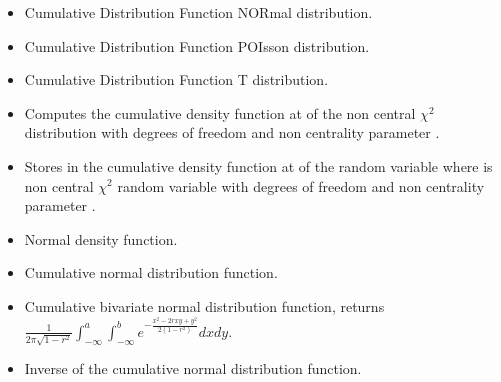 \begin{itemize}
\item {}
  \sshortdescribe Cumulative Distribution Function NORmal distribution.

\item {}
  \sshortdescribe Cumulative Distribution Function POIsson distribution.

\item {}
  \sshortdescribe Cumulative Distribution Function T distribution.

\item {}
  \sshortdescribe Computes the cumulative density function at  of the
  non central $\chi^2$ distribution with  degrees of freedom and non
  centrality parameter .

\item {}
  \sshortdescribe Stores in  the cumulative density function at 
  of the random variable  where  is non central $\chi^2$
  random variable with  degrees of freedom and non
  centrality parameter .


\item {}
  \sshortdescribe Normal density function.

\item {}
  \sshortdescribe Cumulative normal distribution function.

\item {}
  \sshortdescribe Cumulative bivariate normal distribution function, returns
  $\frac{1} {2\pi \sqrt{1-r^2}} \int_{- \infty}^a\int_{- \infty}^b e^{-
    \frac{x^2 - 2 r xy+y^2} {2(1-r^2)} } dxdy.$

\item {}
  \sshortdescribe Inverse of the cumulative normal distribution function.
\end{itemize}


